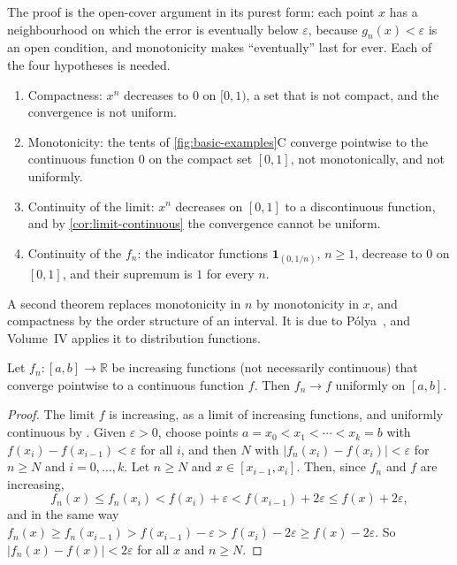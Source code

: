 The proof is the open-cover argument in its purest form: each point $x$ has a neighbourhood on which the error is eventually below $\varepsilon$, because $g_n(x)<\varepsilon$ is an open condition, and monotonicity makes ``eventually'' last for ever. Each of the four hypotheses is needed.
\begin{enumerate}
\item Compactness: $x^n$ decreases to $0$ on $[0,1)$, a set that is not compact, and the convergence is not uniform.
\item Monotonicity: the tents of \cref{fig:basic-examples}C converge pointwise to the continuous function $0$ on the compact set $[0,1]$, not monotonically, and not uniformly.
\item Continuity of the limit: $x^n$ decreases on $[0,1]$ to a discontinuous function, and by \cref{cor:limit-continuous} the convergence cannot be uniform.
\item Continuity of the $f_n$: the indicator functions $\mathbf 1_{(0,1/n)}$, $n\ge1$, decrease to $0$ on $[0,1]$, and their supremum is $1$ for every $n$.
\end{enumerate}

A second theorem replaces monotonicity in $n$ by monotonicity in $x$, and compactness by the order structure of an interval. It is due to P\'olya~\cite{polya1920}, and Volume~IV applies it to distribution functions.

\begin{proposition}
\label{prop:polya}
Let $f_n\colon[a,b]\to\mathbb R$ be increasing functions (not necessarily continuous) that converge pointwise to a continuous function $f$. Then $f_n\to f$ uniformly on $[a,b]$.
\end{proposition}

\begin{proof}
The limit $f$ is increasing, as a limit of increasing functions, and uniformly continuous by . Given $\varepsilon>0$, choose points $a=x_0<x_1<\cdots<x_k=b$ with $f(x_i)-f(x_{i-1})<\varepsilon$ for all $i$, and then $N$ with $|f_n(x_i)-f(x_i)|<\varepsilon$ for $n\ge N$ and $i=0,\ldots,k$. Let $n\ge N$ and $x\in[x_{i-1},x_i]$. Then, since $f_n$ and $f$ are increasing,
\[
f_n(x)\le f_n(x_i)<f(x_i)+\varepsilon<f(x_{i-1})+2\varepsilon\le f(x)+2\varepsilon ,
\]
and in the same way $f_n(x)\ge f_n(x_{i-1})>f(x_{i-1})-\varepsilon>f(x_i)-2\varepsilon\ge f(x)-2\varepsilon$. So $|f_n(x)-f(x)|<2\varepsilon$ for all $x$ and $n\ge N$.
\end{proof}

